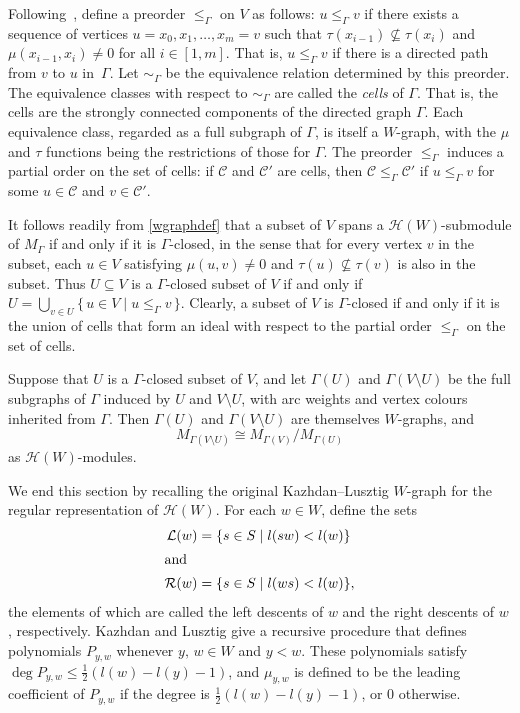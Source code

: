 \documentclass[10pt]{amsart}
\theoremstyle{definition}
\begin{document}
Following~\cite{kazlus:coxhecke}, define a preorder
$\leqslant_{\Gamma}$ on $V$ as follows: $u \leqslant_{\Gamma} v$
if there exists a sequence of vertices $u = x_{0},x_{1},
\ldots, x_{m} = v$ such that $\tau(x_{i-1}) \nsubseteq
\tau(x_{i})$ and $\mu(x_{i-1},x_{i}) \neq 0$ for all $i \in
[1,m]$. That is, $u \leqslant_{\Gamma} v$ if there is a directed path
from $v$ to $u$ in~$\Gamma$. Let $\sim_{\Gamma}$ be
the equivalence relation determined by this preorder.
The equivalence classes with respect to $\sim_{\Gamma}$
are called the \emph{cells} of $\Gamma$. That is, the cells are
the strongly connected components of the directed graph $\Gamma$.
Each equivalence class,
regarded as a full subgraph of $\Gamma$, is itself a $W\!$-graph,
with the $\mu$ and $\tau$ functions being the restrictions
of those for $\Gamma$. The preorder $\leqslant_{\Gamma}$ induces a partial
order on the set of cells: if $\mathcal{C}$ and $\mathcal{C}'$ are
cells, then $\mathcal{C} \leqslant_{\Gamma} \mathcal{C}'$ if $u \leqslant_{\Gamma} v$
for some $u \in \mathcal{C}$ and $v \in \mathcal{C}'$.

It follows readily from \eqref{wgraphdef} that a subset of
$V$ spans a $\mathcal{H}(W)$-submodule of $M_{\Gamma}$ if
and only if it is $\Gamma$-closed, in the sense that for every vertex
$v$ in the subset, each $u\in V$ satisfying $\mu(u,v)\ne 0$ and
$\tau(u)\nsubseteq\tau(v)$ is also in the subset.
Thus $U\subseteq V$ is a $\Gamma$-closed subset of $V$ if and
only if $U=\bigcup_{v\in U}\{\,u\in V\mid u\leqslant_{\Gamma}v\,\}$.
Clearly, a subset of $V$ is $\Gamma$-closed if and only if it is the
union of cells that form an ideal with respect to the partial order
$\leqslant_\Gamma$ on the set of cells.

Suppose that $U$ is a $\Gamma$-closed subset of $V$, and let
$\Gamma(U)$ and $\Gamma(V \setminus U)$ be the full subgraphs of
$\Gamma$ induced by $U$ and $V \setminus U$, with arc weights
and vertex colours inherited from $\Gamma$. Then $\Gamma(U)$ and
$\Gamma(V \setminus U)$ are themselves $W\!$-graphs, and
\[
M_{\Gamma(V \setminus U)} \cong M_{\Gamma(V)}/M_{\Gamma(U)}
\]
as $\mathcal{H}(W)$-modules.

We end this section by recalling the original Kazhdan--Lusztig $W\!$-graph
for the regular representation of $\mathcal{H}(W)$.
For each $w \in W$, define the sets
\begin{align*}
\mathcal{L}(w) &= \{s \in S \mid l(sw) < l(w)\}\\
\intertext{and}
\mathcal{R}(w) & = \{s \in S \mid l(ws) < l(w)\},
\end{align*}
the elements of which are called the left descents of $w$ and the right descents
of $w$, respectively. Kazhdan and Lusztig give a recursive procedure that defines
polynomials $P_{y,w}$ whenever $y,\,w \in W$ and $y < w$. These polynomials satisfy
$\deg P_{y,w}\leqslant\frac12(l(w)-l(y)-1)$, and $\mu_{y,w}$ is defined to be
the leading coefficient of $P_{y,w}$ if the degree is $\frac12(l(w)-l(y)-1)$,
or 0 otherwise.
\end{document}
